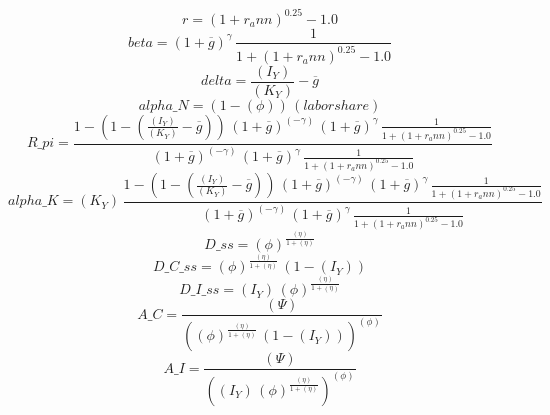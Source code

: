 \begin{dmath*}
r = \left(1+{{r_ann}}\right)^{0.25}-1.0
\end{dmath*}
\begin{dmath*}
beta = \left(1+{{\overline{g}}}\right)^{{{\gamma}}}\, \frac{1}{1+\left(1+{{r_ann}}\right)^{0.25}-1.0}
\end{dmath*}
\begin{dmath*}
delta = \frac{{(I_Y)}}{{(K_Y)}}-{{\overline{g}}}
\end{dmath*}
\begin{dmath*}
alpha\_N = \left(1-{(\phi)}\right)\, {(labor share)}
\end{dmath*}
\begin{dmath*}
R\_pi = \frac{1-\left(1-\left(\frac{{(I_Y)}}{{(K_Y)}}-{{\overline{g}}}\right)\right)\, \left(1+{{\overline{g}}}\right)^{\left(-{{\gamma}}\right)}\, \left(1+{{\overline{g}}}\right)^{{{\gamma}}}\, \frac{1}{1+\left(1+{{r_ann}}\right)^{0.25}-1.0}}{\left(1+{{\overline{g}}}\right)^{\left(-{{\gamma}}\right)}\, \left(1+{{\overline{g}}}\right)^{{{\gamma}}}\, \frac{1}{1+\left(1+{{r_ann}}\right)^{0.25}-1.0}}
\end{dmath*}
\begin{dmath*}
alpha\_K = {(K_Y)}\, \frac{1-\left(1-\left(\frac{{(I_Y)}}{{(K_Y)}}-{{\overline{g}}}\right)\right)\, \left(1+{{\overline{g}}}\right)^{\left(-{{\gamma}}\right)}\, \left(1+{{\overline{g}}}\right)^{{{\gamma}}}\, \frac{1}{1+\left(1+{{r_ann}}\right)^{0.25}-1.0}}{\left(1+{{\overline{g}}}\right)^{\left(-{{\gamma}}\right)}\, \left(1+{{\overline{g}}}\right)^{{{\gamma}}}\, \frac{1}{1+\left(1+{{r_ann}}\right)^{0.25}-1.0}}
\end{dmath*}
\begin{dmath*}
D\_ss = {(\phi)}^{\frac{{(\eta)}}{1+{(\eta)}}}
\end{dmath*}
\begin{dmath*}
D\_C\_ss = {(\phi)}^{\frac{{(\eta)}}{1+{(\eta)}}}\, \left(1-{(I_Y)}\right)
\end{dmath*}
\begin{dmath*}
D\_I\_ss = {(I_Y)}\, {(\phi)}^{\frac{{(\eta)}}{1+{(\eta)}}}
\end{dmath*}
\begin{dmath*}
A\_C = \frac{{(\Psi)}}{\left({(\phi)}^{\frac{{(\eta)}}{1+{(\eta)}}}\, \left(1-{(I_Y)}\right)\right)^{{(\phi)}}}
\end{dmath*}
\begin{dmath*}
A\_I = \frac{{(\Psi)}}{\left({(I_Y)}\, {(\phi)}^{\frac{{(\eta)}}{1+{(\eta)}}}\right)^{{(\phi)}}}
\end{dmath*}
